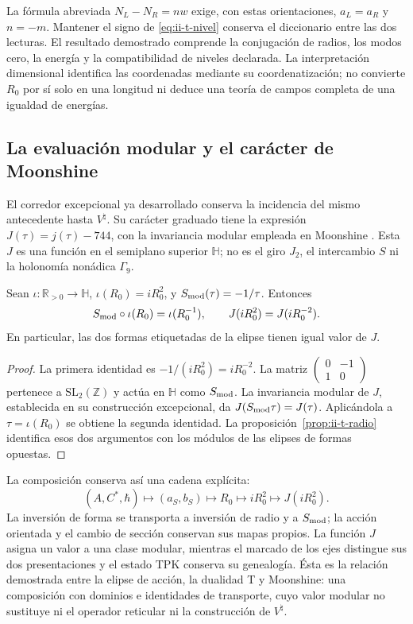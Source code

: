 La fórmula abreviada \(N_L-N_R=nw\) exige, con estas orientaciones,
\(a_L=a_R\) y \(n=-m\). Mantener el signo de
\eqref{eq:ii-t-nivel} conserva el diccionario entre las dos lecturas.
El resultado demostrado comprende la conjugación de radios, los modos
cero, la energía y la compatibilidad de niveles declarada. La interpretación
dimensional identifica las coordenadas mediante su coordenatización; no convierte
\(R_0\) por sí solo en una longitud ni deduce una teoría de campos
completa de una igualdad de energías.

\subsection{La evaluación modular y el carácter de Moonshine}

El corredor excepcional ya desarrollado conserva la incidencia del mismo
antecedente hasta \(V^\natural\). Su carácter graduado tiene la expresión
\(J(\tau)=j(\tau)-744\), con la invariancia modular empleada en
Moonshine \cite{flm,borcherds}. Esta \(J\) es una función en el
semiplano superior \(\mathbb H\); no es el giro \(J_2\), el
intercambio \(S\) ni la holonomía nonádica \(\Gamma_9\).

\begin{proposition}
\label{prop:ii-t-modular}
Sean \(\iota:\mathbb R_{>0}\to\mathbb H\),
\(\iota(R_0)=iR_0^2\), y
\(S_{\rm mod}(\tau)=-1/\tau\). Entonces
\begin{equation}
 S_{\rm mod}\circ\iota(R_0)=\iota(R_0^{-1}),\qquad
 J(iR_0^2)=J(iR_0^{-2}).
 \label{eq:ii-t-modular}
\end{equation}
En particular, las dos formas etiquetadas de la elipse tienen igual
valor de \(J\).
\end{proposition}

\begin{proof}
La primera identidad es
\(-1/(iR_0^2)=iR_0^{-2}\). La matriz
\(\left(\begin{smallmatrix}0&-1\\1&0\end{smallmatrix}\right)\)
pertenece a \(\mathrm{SL}_2(\mathbb Z)\) y actúa en
\(\mathbb H\) como \(S_{\rm mod}\). La invariancia modular de
\(J\), establecida en su construcción excepcional, da
\(J(S_{\rm mod}\tau)=J(\tau)\). Aplicándola a
\(\tau=\iota(R_0)\) se obtiene la segunda identidad.
La proposición~\ref{prop:ii-t-radio} identifica esos dos argumentos
con los módulos de las elipses de formas opuestas.
\end{proof}

La composición conserva así una cadena explícita:
\[
 (A,C^*,\hbar)\longmapsto(a_S,b_S)
 \longmapsto R_0\longmapsto iR_0^2\longmapsto J(iR_0^2).
\]
La inversión de forma se transporta a inversión de radio y a
\(S_{\rm mod}\); la acción orientada y el cambio de sección conservan
sus mapas propios. La función \(J\) asigna un valor a una clase modular, mientras
el marcado de los ejes distingue sus dos presentaciones y el estado TPK
conserva su genealogía. Ésta es la relación demostrada entre la elipse de
acción, la dualidad T y Moonshine: una composición con dominios e
identidades de transporte, cuyo valor modular no sustituye ni el operador
reticular ni la construcción de \(V^\natural\).
